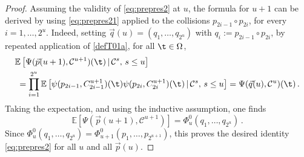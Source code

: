 \documentclass[11pt,reqno]{amsart}
\numberwithin{equation}{section}
\numberwithin{figure}{section}
\newcommand{\1}{\mathds{1}}
\newcommand{\tc}{\,|\,}
\let\O=\Omega
\newcommand{\cC}{\ensuremath{\mathcal C}}
\newcommand{\bbE}{{\ensuremath{\mathbb E}} }
\begin{document}
\begin{proof}
  
Assuming the validity of \eqref{eq:prepres2} at $u$, the formula for $u+1$ can be derived by using \eqref{eq:prepres21} applied to the collisions $ p_{2i-1}\circ p_{2i}$, for every $i=1,\dots,2^u$. Indeed, setting $\vec q(u)=(q_1,\dots,q_{2^u})$ with $q_i :=p_{2i-1}\circ p_{2i}$,  by repeated application of \eqref{defT01a}, for all $\t\in\O$, 
\begin{align} \label{eq:prepres3}
&\bbE\left[\Psi(\vec p(u+1),\cC^{u+1})(\t)\tc\cC^s,\,s\le u\right] %
\nonumber \\& \; =\prod_{i=1}^{2^{u}}\bbE\left[\psi(p_{2i-1},C_{2i-1}^{u+1})(\t)\psi(p_{2i},C_{2i}^{u+1})(\t)\tc\cC^s,\,s\le u\right]=\Psi(\vec q(u),\cC^u)(\t)\,.
\end{align}
Taking the expectation, and using the inductive assumption, one finds 
\[
\bbE\left[\Psi(\vec p(u+1),\cC^{u+1})\right]=\Phi^0_u(q_1,\dots,q_{2^u})\,.
\]
Since $\Phi^0_u(q_1,\dots,q_{2^u})=\Phi^0_{u+1}(p_1,\dots,p_{2^{u+1}})$, this proves the desired identity \eqref{eq:prepres2} for all $u$ and all $\vec p(u)$. 
\end{proof}
\end{document}
